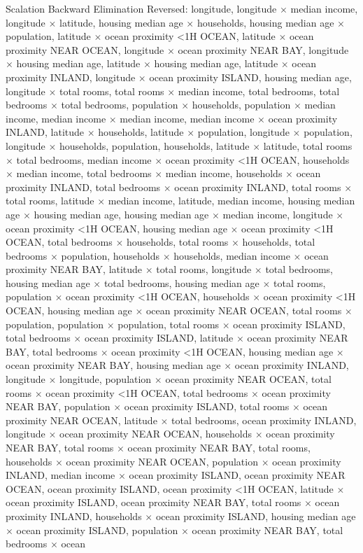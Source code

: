 \documentclass{article}
\begin{document}
Scalation Backward Elimination Reversed: longitude, longitude $\times$ median income, longitude $\times$ latitude, housing median age $\times$ households, housing median age $\times$ population, latitude $\times$ ocean proximity <1H OCEAN, latitude $\times$ ocean proximity NEAR OCEAN, longitude $\times$ ocean proximity NEAR BAY, longitude $\times$ housing median age, latitude $\times$ housing median age, latitude $\times$ ocean proximity INLAND, longitude $\times$ ocean proximity ISLAND, housing median age, longitude $\times$ total rooms, total rooms $\times$ median income, total bedrooms, total bedrooms $\times$ total bedrooms, population $\times$ households, population $\times$ median income, median income $\times$ median income, median income $\times$ ocean proximity INLAND, latitude $\times$ households, latitude $\times$ population, longitude $\times$ population, longitude $\times$ households, population, households, latitude $\times$ latitude, total rooms $\times$ total bedrooms, median income $\times$ ocean proximity <1H OCEAN, households $\times$ median income, total bedrooms $\times$ median income, households $\times$ ocean proximity INLAND, total bedrooms $\times$ ocean proximity INLAND, total rooms $\times$ total rooms, latitude $\times$ median income, latitude, median income, housing median age $\times$ housing median age, housing median age $\times$ median income, longitude $\times$ ocean proximity <1H OCEAN, housing median age $\times$ ocean proximity <1H OCEAN, total bedrooms $\times$ households, total rooms $\times$ households, total bedrooms $\times$ population, households $\times$ households, median income $\times$ ocean proximity NEAR BAY, latitude $\times$ total rooms, longitude $\times$ total bedrooms, housing median age $\times$ total bedrooms, housing median age $\times$ total rooms, population $\times$ ocean proximity <1H OCEAN, households $\times$ ocean proximity <1H OCEAN, housing median age $\times$ ocean proximity NEAR OCEAN, total rooms $\times$ population, population $\times$ population, total rooms $\times$ ocean proximity ISLAND, total bedrooms $\times$ ocean proximity ISLAND, latitude $\times$ ocean proximity NEAR BAY, total bedrooms $\times$ ocean proximity <1H OCEAN, housing median age $\times$ ocean proximity NEAR BAY, housing median age $\times$ ocean proximity INLAND, longitude $\times$ longitude, population $\times$ ocean proximity NEAR OCEAN, total rooms $\times$ ocean proximity <1H OCEAN, total bedrooms $\times$ ocean proximity NEAR BAY, population $\times$ ocean proximity ISLAND, total rooms $\times$ ocean proximity NEAR OCEAN, latitude $\times$ total bedrooms, ocean proximity INLAND, longitude $\times$ ocean proximity NEAR OCEAN, households $\times$ ocean proximity NEAR BAY, total rooms $\times$ ocean proximity NEAR BAY, total rooms, households $\times$ ocean proximity NEAR OCEAN, population $\times$ ocean proximity INLAND, median income $\times$ ocean proximity ISLAND, ocean proximity NEAR OCEAN, ocean proximity ISLAND, ocean proximity <1H OCEAN, latitude $\times$ ocean proximity ISLAND, ocean proximity NEAR BAY, total rooms $\times$ ocean proximity INLAND, households $\times$ ocean proximity ISLAND, housing median age $\times$ ocean proximity ISLAND, population $\times$ ocean proximity NEAR BAY, total bedrooms $\times$ ocean 
\end{document}
